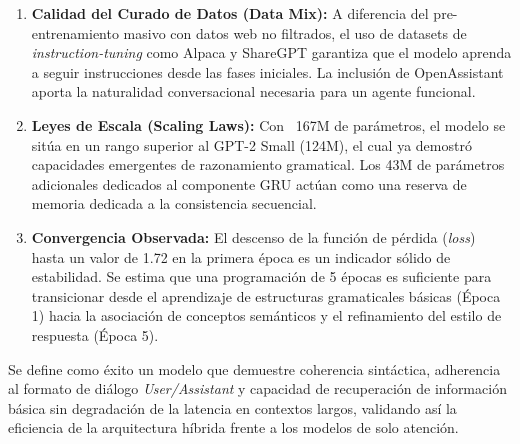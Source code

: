 \begin{enumerate}
    \item \textbf{Calidad del Curado de Datos (Data Mix):} A diferencia del pre-entrenamiento masivo con datos web no filtrados, el uso de datasets de \textit{instruction-tuning} como Alpaca y ShareGPT garantiza que el modelo aprenda a seguir instrucciones desde las fases iniciales. La inclusión de OpenAssistant aporta la naturalidad conversacional necesaria para un agente funcional.
    \item \textbf{Leyes de Escala (Scaling Laws):} Con ~167M de parámetros, el modelo se sitúa en un rango superior al GPT-2 Small (124M), el cual ya demostró capacidades emergentes de razonamiento gramatical. Los 43M de parámetros adicionales dedicados al componente GRU actúan como una reserva de memoria dedicada a la consistencia secuencial.
    \item \textbf{Convergencia Observada:} El descenso de la función de pérdida (\textit{loss}) hasta un valor de 1.72 en la primera época es un indicador sólido de estabilidad. Se estima que una programación de 5 épocas es suficiente para transicionar desde el aprendizaje de estructuras gramaticales básicas (Época 1) hacia la asociación de conceptos semánticos y el refinamiento del estilo de respuesta (Época 5).
\end{enumerate}

Se define como éxito un modelo que demuestre coherencia sintáctica, adherencia al formato de diálogo \textit{User/Assistant} y capacidad de recuperación de información básica sin degradación de la latencia en contextos largos, validando así la eficiencia de la arquitectura híbrida frente a los modelos de solo atención.
